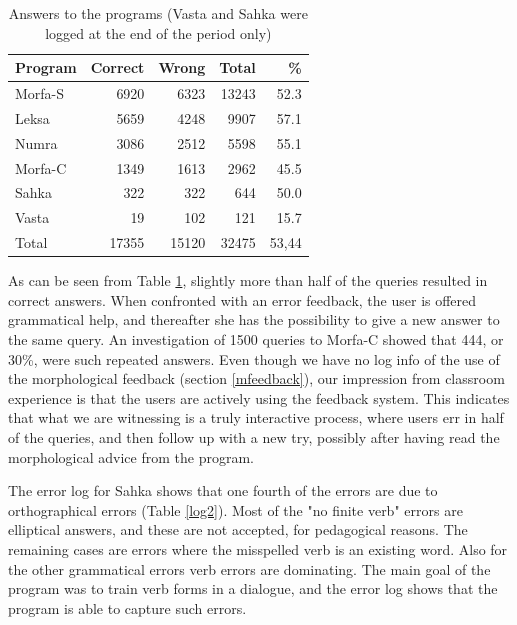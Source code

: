 \documentclass[11pt]{article}
\begin{document}
\begin{table}[htdp]
\caption{Answers to the programs (Vasta and Sahka were logged at the end of the period only)}
\begin{center}
\begin{tabular}{|l|r|r|r|r|}
\hline
Program     & Correct &   Wrong &    Total &  \% \\
\hline									 
Morfa-S  &  6920   & 6323    & 13243    & 52.3 \\
Leksa    &  5659   & 4248    & 9907	    & 57.1  \\
Numra    &  3086   & 2512    & 5598	    & 55.1  \\
Morfa-C  &  1349   & 1613    & 2962	    & 45.5  \\
Sahka    &   322   &   322   &  644	    & 50.0  \\
Vasta    &   19    &   102   &  121	    & 15.7 \\
\hline
Total   & 17355  &  15120  &  32475  &  53,44\\
\hline
\end{tabular}
\end{center}
\label{log1}
\end{table}


As can be seen from Table \ref{log1}, slightly more than half of the queries resulted in correct answers. When confronted with an error feedback, the user is offered grammatical help, and thereafter she has the possibility to give a new answer to the same query. An investigation of 1500 queries to Morfa-C showed that 444, or 30\%, were such repeated answers. Even though we have no log info of the use of the morphological feedback (section \ref{mfeedback}), our impression from classroom experience is that the users are actively using the feedback system. This indicates that what we are witnessing is a truly interactive process, where users err in half of the queries, and then follow up with a new try, possibly after having read the morphological advice from the program.

The error log for Sahka shows that one fourth of the errors are due to orthographical errors (Table \ref{log2}). Most of the "no finite verb" errors are elliptical answers, and these are not accepted, for pedagogical reasons. The remaining cases are errors where the misspelled verb is an existing word. Also for the other grammatical errors verb errors are dominating. The main goal of the program was to train verb forms in a dialogue, and the error log shows that the program is able to capture such errors.
\end{document}
